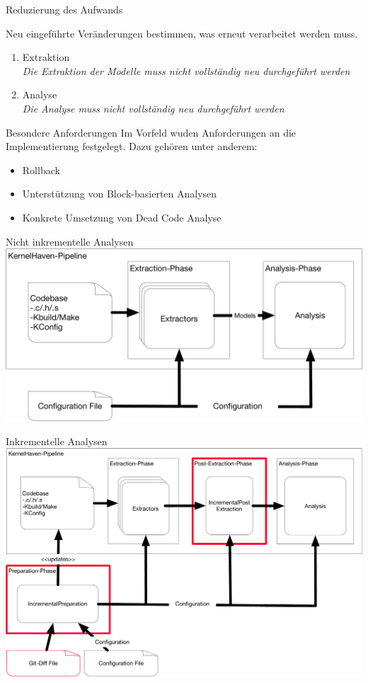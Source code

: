 \documentclass[aspectratio=43, noserifmath]{beamer}
\begin{document}
\begin{frame}{Reduzierung des Aufwands}

Neu eingef\"uhrte Ver\"anderungen bestimmen, was erneut verarbeitet werden muss.
\pause
\begin{enumerate}
	\item Extraktion \\
	\emph{Die Extraktion der Modelle muss nicht vollst\"andig neu durchgef\"uhrt werden}
	\pause
	\item Analyse \\
	\emph{Die Analyse muss nicht vollst\"andig neu durchgef\"uhrt werden}
\end{enumerate}
\end{frame}

\begin{frame}{Besondere Anforderungen}
Im Vorfeld wuden Anforderungen an die Implementierung festgelegt.
Dazu geh\"oren unter anderem:
\begin{itemize}
	\item[\textbullet] Rollback
	\item[\textbullet] Unterst\"utzung von Block-basierten Analysen
	\item[\textbullet] Konkrete Umsetzung von Dead Code Analyse
\end{itemize}
\end{frame}



\begin{frame}{Nicht inkrementelle Analysen}
\includegraphics[width=1\textwidth]{image/KernelHaven.pdf}
\end{frame}


\begin{frame}{Inkrementelle Analysen}
\includegraphics[width=1\textwidth]{image/KernelHavenIncremental.pdf}
\end{frame}
\end{document}
